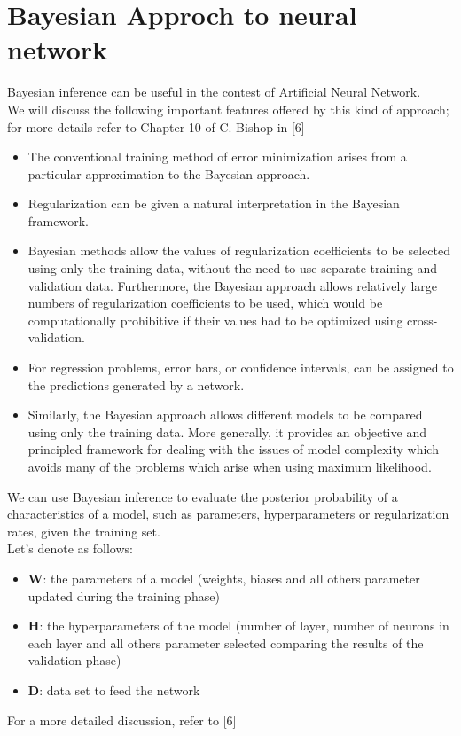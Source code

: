 \section{Bayesian Approch to neural network}
Bayesian inference can be useful in the contest of Artificial Neural Network.\\
We will discuss the following important features offered by this kind of approach; for more details refer to Chapter 10  of C. Bishop in [6]
\begin{itemize}
\item The conventional training method of error minimization arises from a particular approximation to the Bayesian approach.
\item Regularization can be given a natural interpretation in the Bayesian framework.
\item Bayesian methods allow the values of regularization coefficients to be selected using only the training data, without the need to use separate training and validation data. Furthermore, the Bayesian approach allows relatively large numbers of regularization coefficients to be used, which would be computationally prohibitive if their values had to be optimized using cross-validation.
\item For regression problems, error bars, or confidence intervals, can be assigned to the predictions generated by a network.
\item Similarly, the Bayesian approach allows different models to be compared using only the training data. More generally, it provides an objective and principled framework for dealing with the issues of model complexity which avoids many of the problems which arise when using maximum likelihood.
\end{itemize}

 We can use Bayesian inference to evaluate the posterior probability of a characteristics of a model, such as parameters, hyperparameters or regularization rates, given the training set.\\
Let's denote as follows:
\begin{itemize}
	\item \textbf{W}: the parameters of a model (weights, biases and all others parameter updated during the training phase)
	\item \textbf{H}: the hyperparameters of the model (number of layer, number of neurons in each layer and all others parameter selected comparing the results of the validation phase)
	\item \textbf{D}: data set to feed the network
\end{itemize}
For a more detailed discussion, refer to [6]

